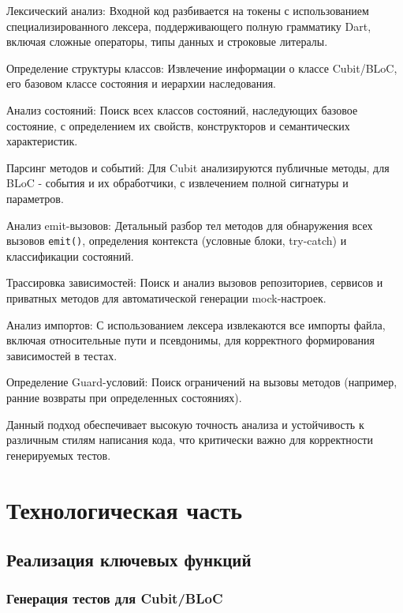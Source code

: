\documentclass[14pt, russian]{scrartcl}
\begin{document}
\begin{itemize*}
    \item Лексический анализ: Входной код разбивается на токены с использованием специализированного лексера, поддерживающего полную грамматику Dart, включая сложные операторы, типы данных и строковые литералы.
    \item Определение структуры классов: Извлечение информации о классе Cubit/BLoC, его базовом классе состояния и иерархии наследования.
    \item Анализ состояний: Поиск всех классов состояний, наследующих базовое состояние, с определением их свойств, конструкторов и семантических характеристик.
    \item Парсинг методов и событий: Для Cubit анализируются публичные методы, для BLoC - события и их обработчики, с извлечением полной сигнатуры и параметров.
    \item Анализ emit-вызовов: Детальный разбор тел методов для обнаружения всех вызовов \texttt{emit()}, определения контекста (условные блоки, try-catch) и классификации состояний.
    \item Трассировка зависимостей: Поиск и анализ вызовов репозиториев, сервисов и приватных методов для автоматической генерации mock-настроек.
    \item Анализ импортов: С использованием лексера извлекаются все импорты файла, включая относительные пути и псевдонимы, для корректного формирования зависимостей в тестах.
    \item Определение Guard-условий: Поиск ограничений на вызовы методов (например, ранние возвраты при определенных состояниях).
\end{itemize*}

Данный подход обеспечивает высокую точность анализа и устойчивость к различным стилям написания кода, что критически важно для корректности генерируемых тестов.

\section{Технологическая часть}

\subsection{Реализация ключевых функций}

\subsubsection{Генерация тестов для Cubit/BLoC}
\end{document}
